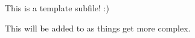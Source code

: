 \documentclass[../OpenAppliedMusicTheory.tex]{subfiles}
\begin{document}
    
    This is a template subfile! :)

    \noindent This will be added to as things get more complex.
\end{document}
